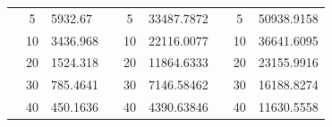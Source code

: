 \begin{table}[]
\begin{tabular}{|cclcclccl|}
\rowcolor[HTML]{DDFDFF} 
\multicolumn{1}{|c|}{\cellcolor[HTML]{FFFFC7}}                       & \multicolumn{1}{c|}{\cellcolor[HTML]{DDFDFF}5}         & \multicolumn{1}{l|}{\cellcolor[HTML]{DDFDFF}5932.67}    & \multicolumn{1}{c|}{\cellcolor[HTML]{FFFFC7}}                       & \multicolumn{1}{c|}{\cellcolor[HTML]{DDFDFF}5}         & \multicolumn{1}{l|}{\cellcolor[HTML]{DDFDFF}33487.7872} & \multicolumn{1}{c|}{\cellcolor[HTML]{FFFFC7}}                       & \multicolumn{1}{c|}{\cellcolor[HTML]{DDFDFF}5}         & 50938.9158 \\ \cline{2-3} \cline{5-6} \cline{8-9} 
\rowcolor[HTML]{DAE8FC} 
\multicolumn{1}{|c|}{\cellcolor[HTML]{FFFFC7}}                       & \multicolumn{1}{c|}{\cellcolor[HTML]{DAE8FC}10}        & \multicolumn{1}{l|}{\cellcolor[HTML]{DAE8FC}3436.968}   & \multicolumn{1}{c|}{\cellcolor[HTML]{FFFFC7}}                       & \multicolumn{1}{c|}{\cellcolor[HTML]{DAE8FC}10}        & \multicolumn{1}{l|}{\cellcolor[HTML]{DAE8FC}22116.0077} & \multicolumn{1}{c|}{\cellcolor[HTML]{FFFFC7}}                       & \multicolumn{1}{c|}{\cellcolor[HTML]{DAE8FC}10}        & 36641.6095 \\ \cline{2-3} \cline{5-6} \cline{8-9} 
\rowcolor[HTML]{DDFDFF} 
\multicolumn{1}{|c|}{\cellcolor[HTML]{FFFFC7}}                       & \multicolumn{1}{c|}{\cellcolor[HTML]{DDFDFF}20}        & \multicolumn{1}{l|}{\cellcolor[HTML]{DDFDFF}1524.318}   & \multicolumn{1}{c|}{\cellcolor[HTML]{FFFFC7}}                       & \multicolumn{1}{c|}{\cellcolor[HTML]{DDFDFF}20}        & \multicolumn{1}{l|}{\cellcolor[HTML]{DDFDFF}11864.6333} & \multicolumn{1}{c|}{\cellcolor[HTML]{FFFFC7}}                       & \multicolumn{1}{c|}{\cellcolor[HTML]{DDFDFF}20}        & 23155.9916 \\ \cline{2-3} \cline{5-6} \cline{8-9} 
\rowcolor[HTML]{DAE8FC} 
\multicolumn{1}{|c|}{\cellcolor[HTML]{FFFFC7}}                       & \multicolumn{1}{c|}{\cellcolor[HTML]{DAE8FC}30}        & \multicolumn{1}{l|}{\cellcolor[HTML]{DAE8FC}785.4641}   & \multicolumn{1}{c|}{\cellcolor[HTML]{FFFFC7}}                       & \multicolumn{1}{c|}{\cellcolor[HTML]{DAE8FC}30}        & \multicolumn{1}{l|}{\cellcolor[HTML]{DAE8FC}7146.58462} & \multicolumn{1}{c|}{\cellcolor[HTML]{FFFFC7}}                       & \multicolumn{1}{c|}{\cellcolor[HTML]{DAE8FC}30}        & 16188.8274 \\ \cline{2-3} \cline{5-6} \cline{8-9} 
\rowcolor[HTML]{DDFDFF} 
\multicolumn{1}{|c|}{\cellcolor[HTML]{FFFFC7}}                       & \multicolumn{1}{c|}{\cellcolor[HTML]{DDFDFF}40}        & \multicolumn{1}{l|}{\cellcolor[HTML]{DDFDFF}450.1636}   & \multicolumn{1}{c|}{\cellcolor[HTML]{FFFFC7}}                       & \multicolumn{1}{c|}{\cellcolor[HTML]{DDFDFF}40}        & \multicolumn{1}{l|}{\cellcolor[HTML]{DDFDFF}4390.63846} & \multicolumn{1}{c|}{\cellcolor[HTML]{FFFFC7}}                       & \multicolumn{1}{c|}{\cellcolor[HTML]{DDFDFF}40}        & 11630.5558 \\ \cline{2-3} \cline{5-6} \cline{8-9} 

\end{tabular}
\end{table}
